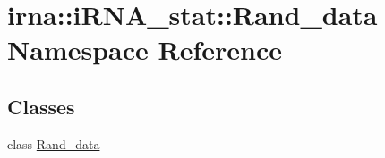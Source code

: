 \hypertarget{namespaceirna_1_1iRNA__stat_1_1Rand__data}{
\section{irna\-:\-:i\-R\-N\-A\-\_\-stat\-:\-:\-Rand\-\_\-data \-Namespace \-Reference}
\label{namespaceirna_1_1iRNA__stat_1_1Rand__data}
}
\subsection*{\-Classes}
\begin{DoxyCompactItemize}
\item 
class \hyperlink{classirna_1_1iRNA__stat_1_1Rand__data_1_1Rand__data}{\-Rand\-\_\-data}
\end{DoxyCompactItemize}
